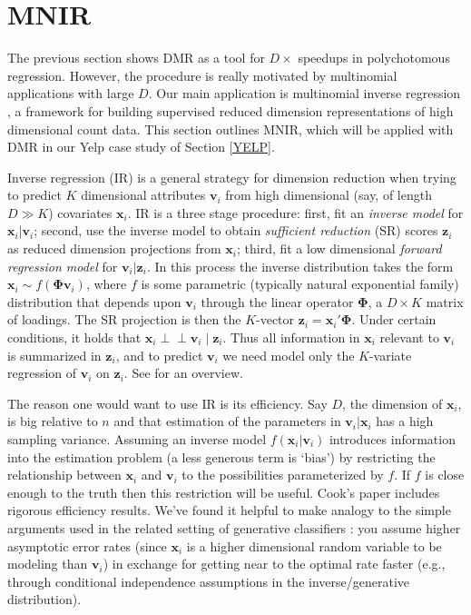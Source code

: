 \documentclass[12pt]{article}
\newcommand{\bs}[1]{\boldsymbol{#1}}
\newcommand{\bm}[1]{\mathbf{#1}}
\newcommand{\indep}{\perp\!\!\!\perp}
\begin{document}
\section{MNIR}
\label{MNIR}

The previous section shows DMR as a tool for $D\times$ speedups in
polychotomous regression.  However, the procedure is really motivated by
multinomial applications with large $D$.  Our main application is multinomial
inverse regression \citep[MNIR][]{taddy_multinomial_2013}, a framework for
building supervised reduced dimension representations of high dimensional
count data.  This section outlines MNIR, which will be applied with DMR in our
Yelp case study of Section \ref{YELP}.

Inverse regression (IR) is a general strategy for dimension reduction when
trying to predict $K$ dimensional attributes $\bm{v}_i$ from high dimensional
(say, of length $D \gg K$) covariates $\bm{x}_i$.  IR is a three stage
procedure: first, fit an {\it inverse model} for $\bm{x}_i | \bm{v}_i$;
second, use the inverse model to obtain {\it sufficient reduction} (SR) scores
$\bm{z}_i$ as reduced dimension projections from $\bm{x}_i$; third, fit a low
dimensional {\it forward regression model} for $\bm{v}_i | \bm{z}_i$.   In
this process the inverse distribution takes the form $\bm{x}_i \sim
f(\bs{\Phi}\bm{v}_i)$, where $f$ is some parametric (typically natural
exponential family) distribution that depends upon $\bm{v}_i$ through the
linear operator $\bs{\Phi}$, a $D\times K$ matrix of loadings.  The SR
projection is then the $K$-vector $\bm{z}_i = \bm{x}_i'\bs{\Phi}$. Under
certain conditions, it  holds that $\bm{x}_i \indep \bm{v}_i \mid \bm{z}_i$.
Thus all information in $\bm{x}_i$ relevant to $\bm{v}_i$ is summarized in
$\bm{z}_i$, and to predict $\bm{v}_i$ we need model only the $K$-variate
regression of $\bm{v}_i$ on $\bm{z}_i$. See \citet{cook_fisher_2007} for an
overview.

The reason one would want to use IR is its efficiency.  Say $D$, the dimension
of $\bm{x}_i$, is big relative to $n$ and that estimation of the parameters in
$\bm{v}_i |\bm{x}_i$ has a high sampling variance.  Assuming an inverse model
$f(\bm{x}_i | \bm{v}_i)$ introduces information into the estimation problem (a
less generous term is `bias') by restricting the relationship between
$\bm{x}_i$ and $\bm{v}_i$ to the possibilities parameterized by $f$.  If $f$
is close enough to the truth then this restriction will be useful.  Cook's
paper includes rigorous efficiency results.  We've found it helpful to make
analogy to the simple arguments used in the related setting of generative
classifiers \citep[e.g., as in][for Gaussian
discrimination]{efron_efficiency_1975}: you  assume higher asymptotic error
rates (since $\bm{x}_i$ is a higher dimensional random variable to be modeling
than $\bm{v}_i$) in exchange for getting near to the optimal rate faster
(e.g., through conditional independence assumptions in the inverse/generative
distribution).
\end{document}
